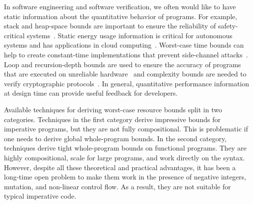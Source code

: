\documentclass[nocopyrightspace,preprint]{sigplanconf}
\begin{document}
In software engineering and software verification,
we often would like to have static information
about the quantitative behavior of programs.
For example, stack and heap-space bounds
are important to ensure the reliability of
safety-critical systems~\cite{veristack14,Regehr05}.
Static energy usage information is critical
for autonomous systems and has applications in
cloud computing~\cite{CohenZSL12,CarrollH10}.
Worst-case time bounds can help to create
constant-time implementations that prevent
side-channel attacks~\cite{KasperS09,BartheBCLP14}.
Loop and recursion-depth bounds are used to
ensure the accuracy of programs that are executed
on unreliable hardware~\cite{CarbinMR13} and
complexity bounds are needed to verify cryptographic
protocols~\cite{BartheGB09}.  In general, quantitative
performance information at design time can provide useful
feedback for developers.





Available techniques for deriving worst-case resource bounds
split in two categories.  Techniques
in the first category derive impressive bounds for
imperative programs, but they are not fully compositional.
This is problematic if one needs to derive global whole-program bounds.
In the second category, techniques derive tight whole-program
bounds on functional programs.
They are highly compositional, scale for large
programs, and work directly on the syntax.  However, despite all
these theoretical and practical advantages, it has been
a long-time open problem to make them work in the
presence of negative integers, mutation, and non-linear
control flow. As a result, they are not suitable for
typical imperative code.
%
\end{document}
